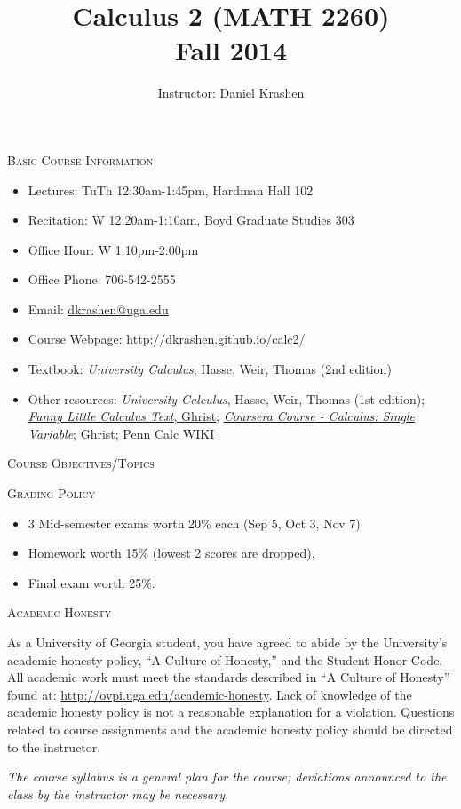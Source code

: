 \documentclass[12pt]{amsart}
\title{Calculus 2 (MATH 2260) \\ Fall 2014}
\author{Instructor: Daniel Krashen}
\begin{document}
\maketitle


\thispagestyle{empty}
\noindent
\textsc{Basic Course Information}

\begin{itemize}
\item
Lectures: TuTh 12:30am-1:45pm, Hardman Hall 102
\item
Recitation: W 12:20am-1:10am, Boyd Graduate Studies 303
\item 
Office Hour: W 1:10pm-2:00pm
\item
Office Phone: 706-542-2555 
\item
Email: \url{dkrashen@uga.edu} 
\item
Course Webpage:  
\url{http://dkrashen.github.io/calc2/} 
\item
Textbook: \textit{University Calculus}, Hasse, Weir, Thomas (2nd edition)
\item
Other resources: 
\textit{University Calculus}, Hasse, Weir, Thomas (1st edition);
\href{http://www.math.upenn.edu/~ghrist/FLCT/}{\textit{Funny Little
Calculus Text}, Ghrist};
\href{https://class.coursera.org/calcsing-005/lecture/preview}{\textit{Coursera
Course -  Calculus: Single Variable}; Ghrist};
\href{http://calculus.seas.upenn.edu/}{Penn Calc WIKI}
\end{itemize}

\medskip

\noindent
\textsc{Course Objectives/Topics}


\medskip

\noindent
\textsc{Grading Policy}

\begin{itemize}
\item
3 Mid-semester exams worth 20\% each (Sep 5, Oct 3, Nov 7)
\item
Homework worth 15\% (lowest 2
scores are dropped), 
\item
Final exam worth 25\%.
\end{itemize}

\medskip

\noindent
\textsc{Academic Honesty}

As a University of Georgia student, you have agreed to abide by the
University’s academic honesty policy, “A Culture of Honesty,” and the
Student Honor Code.  All academic work must meet the standards described in
“A Culture of Honesty” found at:
\url{http://ovpi.uga.edu/academic-honesty}.  Lack of knowledge of the
academic honesty policy is not a reasonable explanation for a violation.
Questions related to course assignments and the academic honesty policy
should be directed to the instructor.



\smallskip

\textit{The course syllabus is a general plan for the course; deviations
announced to the class by 
the instructor may be necessary.}
\end{document}
